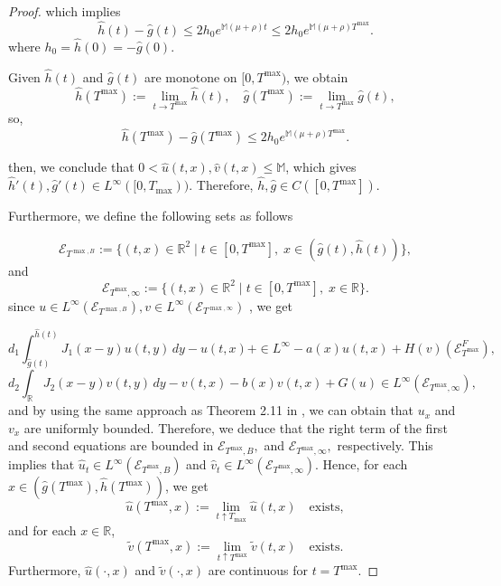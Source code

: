 \documentclass[a4paper,11pt]{amsart}
\theoremstyle{definition}
\numberwithin{equation}{section}
\theoremstyle{definition}
\begin{document}
\begin{proof}
which implies
\[
\hat{h}(t) - \hat{g}(t) \leq 2 h_0 e^{ \mathbb{M} \left( \mu + \rho \right) t} \leq 2 h_0 e^{ \mathbb{M} \left( \mu + \rho \right) T^{\max}}.
\]
where $h_0 = \hat{h}(0) = -\hat{g}(0)$.

Given $\hat{h}(t)$ and $\hat{g}(t)$ are monotone on $[0, T^{\max})$, we obtain
\[
\hat{h}(T^{\max}) := \lim_{t \to T^{\max}} \hat{h}(t),
\quad
\hat{g}(T^{\max}) := \lim_{t \to T^{\max}} \hat{g}(t),
\]
so,
\[
\hat{h}(T^{\max}) - \hat{g}(T^{\max}) \leq 2 h_0 e^{\mathbb{M} (\mu + \rho) T^{\max}}.
\]

then, we conclude that
$0 < \hat{u}(t,x), \hat{v}(t,x) \leq \mathbb{M}$, which gives
$\hat{h}'(t), \hat{g}'(t) \in L^{\infty}([0, T_{\max}))$.
Therefore, $\hat{h}, \hat{g} \in C([0, T^{\max}])$.

\smallskip
Furthermore, we define the following sets as follows

\[
\mathcal{E}_{T^{\max, B}} := \{ (t,x) \in \mathbb{R}^2 \mid t \in [0, T^{\max}], \; x \in (\hat{g}(t), \hat{h}(t)) \},
\]
and
\[
\mathcal{E}_{T^{\max}, \infty} := \{ (t,x) \in \mathbb{R}^2 \mid t \in [0, T^{\max}], \; x \in \mathbb{R}\}.
\]
since $u \in L^\infty(\mathcal{E}_{T^{\max, B}} ), v\in L^\infty(\mathcal{E}_{T^{\max, \infty}} ) $ , we get

\[
d_1 \!\! \displaystyle\int_{\hat{g}(t)}^{\hat{h}(t)} J_1(x-y) u(t,y) \, dy - u(t,x) +  \in L^{\infty} - a(x) u(t,x) + H(v)  (\mathcal{E}^{F}_{T^{\max}}),
\]
\[
d_2 \!\! \displaystyle\int_{\mathbb{R}} J_2(x-y) v(t,y) \, dy - v(t,x) - b(x) v(t,x) + G(u)\in L^{\infty}(\mathcal{E}_{T^{\max}, \infty}),
\]
and by using the same approach as Theorem 2.11 in \cite{Tang2024a}, we can obtain that $u_x$ and $v_x$ are uniformly bounded. Therefore, we deduce that the right term of the first and second equations are bounded in $\mathcal{E}_{T^{\max}, B},$ and $\mathcal{E}_{T^{\max}, \infty},$ respectively. This implies that $\hat{u}_t \in L^\infty(\mathcal{E}_{T^{\max}, B})$ and $\hat{v}_t \in L^{\infty}(\mathcal{E}_{T^{\max}, \infty})$.
Hence, for each $x \in (\hat{g}(T^{\max}), \hat{h}(T^{\max}))$, we get
\[
\hat{u}(T^{\max}, x) := \lim_{t \uparrow T_{\max}} \hat{u}(t, x) \quad \text{exists},
\]
and for each $x \in \mathbb{R}$,
\[
\tilde{v}(T^{\max}, x) := \lim_{t \uparrow T^{\max}} \tilde{v}(t, x) \quad \text{exists}.
\]
Furthermore, $\hat{u}(\cdot, x)$ and $\tilde{v}(\cdot, x)$ are continuous for $t = T^{\max}$.


\end{proof}
\end{document}
